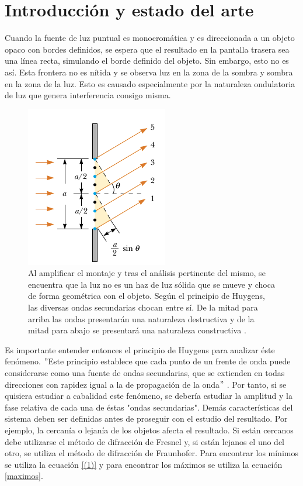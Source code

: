 \documentclass[%
 reprint,
 amsmath,amssymb,
 aps,
]{revtex4-1}
\begin{document}

\section{\label{intro} Introducción y estado del arte}

Cuando la fuente de luz puntual es monocromática y es direccionada a un objeto opaco con bordes definidos, se espera que el resultado en la pantalla trasera sea una línea recta, simulando el borde definido del objeto. Sin embargo, esto no es así. Esta frontera no es nítida y se observa luz en la zona de la sombra y sombra en la zona de la luz. Esto es causado especialmente por la naturaleza ondulatoria de luz que genera interferencia consigo misma. 

\begin{figure}[H]
    \centering
    \includegraphics[scale= 0.6]{rayos}
    \caption{Al amplificar el montaje y tras el análisis pertinente del mismo, se encuentra que la luz no es un haz de luz sólida que se mueve y choca de forma geométrica con el objeto. Según el principio de Huygens, las diversas ondas secundarias chocan entre sí. De la mitad para arriba las ondas presentarán una naturaleza destructiva y de la mitad para abajo se presentará una naturaleza constructiva \cite{fisicauniversitaria}.}
    \label{fig:diagramaexplicativo}
\end{figure}

Es importante entender entonces el principio de Huygens para analizar éste fenómeno. $"$Este principio establece que cada punto de un frente de onda puede considerarse como una fuente de ondas secundarias, que se extienden en todas direcciones con rapidez igual a la de propagación de la onda$"$ \cite{fisicauniversitaria}. Por tanto, si se quisiera estudiar a cabalidad este fenómeno, se debería estudiar la amplitud y la fase relativa de cada una de éstas "ondas secundarias". Demás características del sistema deben ser definidas antes de proseguir con el estudio del resultado. Por ejemplo, la cercanía o lejanía de los objetos afecta el resultado. Si están cercanos debe utilizarse el método de difracción de Fresnel y, si están lejanos el uno del otro, se utiliza el método de difracción de Fraunhofer. Para encontrar los mínimos se utiliza la ecuación \eqref{(1)} y para encontrar los máximos se utiliza la ecuación \eqref{maximos}.
\end{document}
